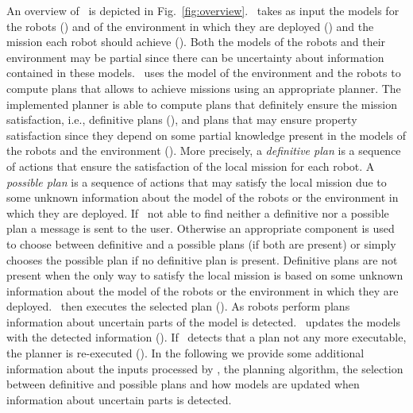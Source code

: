 
An overview of \toolName\ is depicted in Fig.~\ref{fig:overview}.
\toolName\ takes as input the models for the robots () and of the environment in which they are deployed () and the mission each robot should achieve ().
Both the models of the robots and their environment may be partial since there can be uncertainty about information contained in these models.
\toolName\ uses the model of the environment and the robots to compute plans that allows to achieve missions using an appropriate planner.
The implemented planner is able to compute plans that definitely ensure the mission satisfaction, i.e., definitive plans  (), and plans that may ensure property satisfaction since they depend on some partial knowledge present in the models of the robots and the environment  ().
More precisely, a \emph{definitive plan} is a sequence of actions that ensure the satisfaction of the local mission for each robot. 
A \emph{possible plan} is a sequence of actions that may satisfy the local mission due to some unknown information about the model of the robots or the environment in which they are deployed. 
If \toolName\ not able to find neither a definitive nor a possible plan a message is sent to the user.
Otherwise an appropriate component is used to choose between definitive and a possible plans (if both are present) or simply chooses the possible plan if no definitive plan is present.
Definitive plans are not present when the only way to satisfy the local mission is based on some unknown information about the model of the robots or the environment in which they are deployed. 
\toolName\ then executes the selected plan ().
As robots perform plans information about uncertain parts of the model is detected.
\toolName\ updates the   models with the detected information ().
If \toolName\  detects that a plan not any more executable, the planner is re-executed ().
In the following we provide some additional information about the inputs processed  by \toolName, the planning algorithm, the selection between definitive and possible plans and how models are updated when information about uncertain parts is detected.


